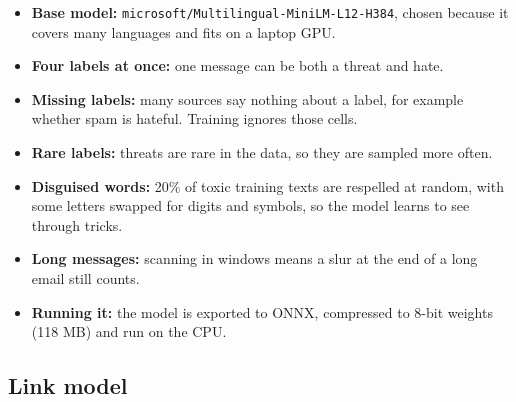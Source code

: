 \documentclass[11pt,a4paper]{article}
\newcommand{\code}[1]{\texttt{#1}}
\newenvironment{fig}[2]{\par\medskip\noindent\begin{minipage}{\linewidth}\centering
  \refstepcounter{figure}\label{#2}\def\figtext{#1}}
  {\par\vspace{5pt}{\small Figure~\thefigure: \figtext\par}\end{minipage}\par\medskip}
\begin{document}
\begin{itemize}
  \item \textbf{Base model:} \code{microsoft/Multilingual-MiniLM-L12-H384}, chosen because it covers many languages and fits on a laptop GPU.
  \item \textbf{Four labels at once:} one message can be both a threat and hate.
  \item \textbf{Missing labels:} many sources say nothing about a label, for example whether spam is hateful. Training ignores those cells.
  \item \textbf{Rare labels:} threats are rare in the data, so they are sampled more often.
  \item \textbf{Disguised words:} 20\% of toxic training texts are respelled at random, with some letters swapped for digits and symbols, so the model learns to see through tricks.
  \item \textbf{Long messages:} scanning in windows means a slur at the end of a long email still counts.
  \item \textbf{Running it:} the model is exported to ONNX, compressed to 8-bit weights (118 MB) and run on the CPU.
\end{itemize}

\subsection*{Link model}

\begin{fig}{Link model. It reads a URL one character at a time.}{fig:url}
\end{fig}
\end{document}
